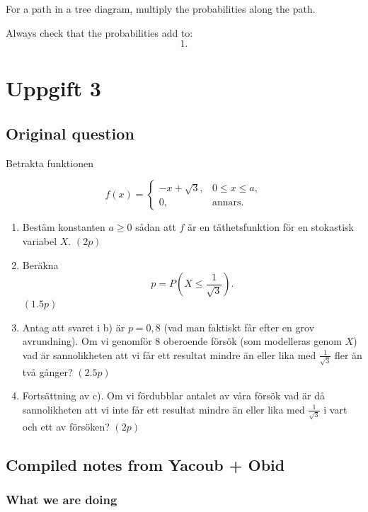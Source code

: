 \documentclass[10pt]{article}
\begin{document}
For a path in a tree diagram, multiply the
probabilities along the path.

Always check that the probabilities add to:
\[
1.
\]

\section*{Uppgift 3}

\subsection*{Original question}

Betrakta funktionen

\[
f(x)=
\begin{cases}
-x+\sqrt{3},
& 0\le x\le a,\\
0,
& \text{annars}.
\end{cases}
\]

\begin{enumerate}[label=\alph*)]
\item Bestäm konstanten \(a\ge 0\) sådan att
\(f\) är en täthetsfunktion för en stokastisk
variabel \(X\). \((2p)\)

\item Beräkna
\[
p=P\left(X\le \frac{1}{\sqrt{3}}\right).
\]
\((1.5p)\)

\item Antag att svaret i b) är \(p=0,8\)
(vad man faktiskt får efter en grov avrundning).
Om vi genomför 8 oberoende försök
(som modelleras genom \(X\)) vad är sannolikheten
att vi får ett resultat mindre än eller lika med
\(\frac{1}{\sqrt{3}}\) fler än två gånger?
\((2.5p)\)

\item Fortsättning av c). Om vi fördubblar antalet
av våra försök vad är då sannolikheten att vi inte
får ett resultat mindre än eller lika med
\(\frac{1}{\sqrt{3}}\) i vart och ett av försöken?
\((2p)\)
\end{enumerate}

\subsection*{Compiled notes from Yacoub + Obid}

\subsubsection*{What we are doing}
\end{document}
